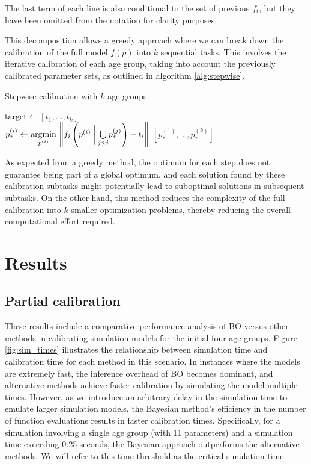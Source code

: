 \documentclass[sn-mathphys,Numbered]{sn-jnl}%
\begin{document}
The last term of each line is also conditional to the set of previous $f_i$, but they have been omitted from the notation for clarity purposes.

This decomposition allows a greedy approach where we can break down the calibration of the full model $f(p)$ into $k$ sequential tasks. This involves the iterative calibration of each age group, taking into account the previously calibrated parameter sets, as outlined in algorithm \ref{alg:stepwise}.

\begin{algorithm}[h!]
	\caption{Stepwise calibration with $k$ age groups}\label{alg:stepwise}
	\begin{algorithmic}
		\Require $\mathrm{target} \gets [t_1, \dots, t_k]$
		 \\
		\State $p_*^{(i)} \gets \underset{p^{(i)}}{\mathrm{argmin}}\, \left\lVert f_i\left(p^{(i)} \hspace{0.25em} \bigg| \hspace{0.25em} \underset{j < i}{\bigcup} p_*^{(j)} \right) -  t_i \right\lVert$
		\EndFor
		\State \Return $[p_*^{(1)}, \dots, p_*^{(k)}]$
	\end{algorithmic}
\end{algorithm}

As expected from a greedy method, the optimum for each step does not guarantee being part of a global optimum, and each solution found by these calibration subtasks might potentially lead to suboptimal solutions in subsequent subtasks. On the other hand, this method reduces the complexity of the full calibration into $k$ smaller optimization problems, thereby reducing the overall computational effort required.

\section{Results}

\label{sec:results-partial}
\subsection{Partial calibration}
These results include a comparative performance analysis of BO versus other methods in calibrating simulation models for the initial four age groups. Figure \ref{fig:sim_times} illustrates the relationship between simulation time and calibration time for each method in this scenario. In instances where the models are extremely fast, the inference overhead of BO becomes dominant, and alternative methods achieve faster calibration by simulating the model multiple times. However, as we introduce an arbitrary delay in the simulation time to emulate larger simulation models, the Bayesian method's efficiency in the number of function evaluations results in faster calibration times. Specifically, for a simulation involving a single age group (with 11 parameters) and a simulation time exceeding 0.25 seconds, the Bayesian approach outperforms the alternative methods. We will refer to this time threshold as the critical simulation time.
\end{document}
